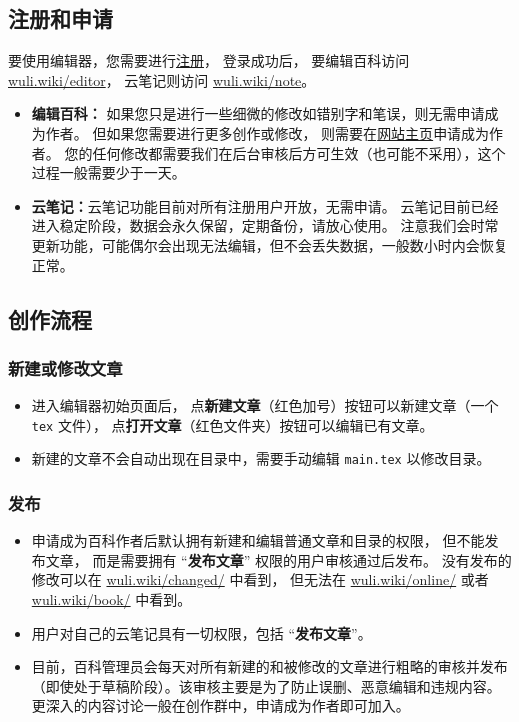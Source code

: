 \subsection{注册和申请}
要使用编辑器，您需要进行\href{https://wuli.wiki/forum}{注册}， 登录成功后， 要编辑百科访问 \href{https://wuli.wiki/editor/}{wuli.wiki/editor}， 云笔记则访问 \href{https://wuli.wiki/note/}{wuli.wiki/note}。
\begin{itemize}
\item \textbf{编辑百科：} 如果您只是进行一些细微的修改如错别字和笔误，则无需申请成为作者。 但如果您需要进行更多创作或修改， 则需要在\href{https://wuli.wiki}{网站主页}申请成为作者。 您的任何修改都需要我们在后台审核后方可生效（也可能不采用），这个过程一般需要少于一天。
\item \textbf{云笔记：}云笔记功能目前对所有注册用户开放，无需申请。 云笔记目前已经进入稳定阶段，数据会永久保留，定期备份，请放心使用。 注意我们会时常更新功能，可能偶尔会出现无法编辑，但不会丢失数据，一般数小时内会恢复正常。
\end{itemize}

\subsection{创作流程}
\subsubsection{新建或修改文章}
\begin{itemize}
\item 进入编辑器初始页面后， 点\textbf{新建文章}（红色加号）按钮可以新建文章（一个 \verb`tex` 文件）， 点\textbf{打开文章}（红色文件夹）按钮可以编辑已有文章。
\item 新建的文章不会自动出现在目录中，需要手动编辑 \verb`main.tex` 以修改目录。
\end{itemize}

\subsubsection{发布}
\begin{itemize}
\item 申请成为百科作者后默认拥有新建和编辑普通文章和目录的权限， 但不能发布文章， 而是需要拥有 “\textbf{发布文章}” 权限的用户审核通过后发布。 没有发布的修改可以在 \href{http://wuli.wiki/changed/}{wuli.wiki/changed/} 中看到， 但无法在 \href{http://wuli.wiki/changed/}{wuli.wiki/online/} 或者 \href{http://wuli.wiki/book/}{wuli.wiki/book/} 中看到。
\item 用户对自己的云笔记具有一切权限，包括 “\textbf{发布文章}”。
\item 目前，百科管理员会每天对所有新建的和被修改的文章进行粗略的审核并发布（即使处于草稿阶段）。该审核主要是为了防止误删、恶意编辑和违规内容。更深入的内容讨论一般在创作群中，申请成为作者即可加入。
\end{itemize}

